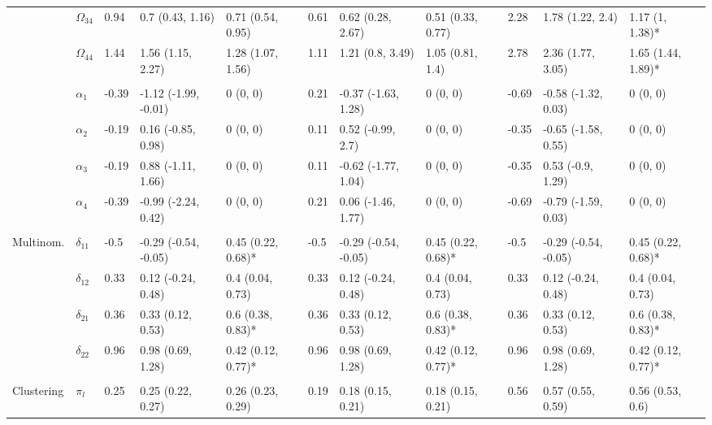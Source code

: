 \documentclass{article}
\begin{document}
\begin{landscape}
\begin{table}[t]
\begin{tabular}{lllllllllll}
\hspace{1em} & $\Omega_{34}$ & 0.94 & 0.7 (0.43, 1.16) & 0.71 (0.54, 0.95) & 0.61 & 0.62 (0.28, 2.67) & 0.51 (0.33, 0.77) & 2.28 & 1.78 (1.22, 2.4) & 1.17 (1, 1.38)*\\
\hspace{1em} & $\Omega_{44}$ & 1.44 & 1.56 (1.15, 2.27) & 1.28 (1.07, 1.56) & 1.11 & 1.21 (0.8, 3.49) & 1.05 (0.81, 1.4) & 2.78 & 2.36 (1.77, 3.05) & 1.65 (1.44, 1.89)*\\
\addlinespace[0.3em]
\multicolumn{11}{l}{\textbf{ }}\\
\hspace{1em} & $\alpha_{1}$ & -0.39 & -1.12 (-1.99, -0.01) & 0 (0, 0) & 0.21 & -0.37 (-1.63, 1.28) & 0 (0, 0) & -0.69 & -0.58 (-1.32, 0.03) & 0 (0, 0)\\
\hspace{1em} & $\alpha_{2}$ & -0.19 & 0.16 (-0.85, 0.98) & 0 (0, 0) & 0.11 & 0.52 (-0.99, 2.7) & 0 (0, 0) & -0.35 & -0.65 (-1.58, 0.55) & 0 (0, 0)\\
\hspace{1em} & $\alpha_{3}$ & -0.19 & 0.88 (-1.11, 1.66) & 0 (0, 0) & 0.11 & -0.62 (-1.77, 1.04) & 0 (0, 0) & -0.35 & 0.53 (-0.9, 1.29) & 0 (0, 0)\\
\hspace{1em} & $\alpha_{4}$ & -0.39 & -0.99 (-2.24, 0.42) & 0 (0, 0) & 0.21 & 0.06 (-1.46, 1.77) & 0 (0, 0) & -0.69 & -0.79 (-1.59, 0.03) & 0 (0, 0)\\
\addlinespace[0.3em]
\multicolumn{11}{l}{\textbf{ }}\\
\hspace{1em}Multinom. & $\delta_{11}$ & -0.5 & -0.29 (-0.54, -0.05) & 0.45 (0.22, 0.68)* & -0.5 & -0.29 (-0.54, -0.05) & 0.45 (0.22, 0.68)* & -0.5 & -0.29 (-0.54, -0.05) & 0.45 (0.22, 0.68)*\\
\hspace{1em} & $\delta_{12}$ & 0.33 & 0.12 (-0.24, 0.48) & 0.4 (0.04, 0.73) & 0.33 & 0.12 (-0.24, 0.48) & 0.4 (0.04, 0.73) & 0.33 & 0.12 (-0.24, 0.48) & 0.4 (0.04, 0.73)\\
\hspace{1em} & $\delta_{21}$ & 0.36 & 0.33 (0.12, 0.53) & 0.6 (0.38, 0.83)* & 0.36 & 0.33 (0.12, 0.53) & 0.6 (0.38, 0.83)* & 0.36 & 0.33 (0.12, 0.53) & 0.6 (0.38, 0.83)*\\
\hspace{1em} & $\delta_{22}$ & 0.96 & 0.98 (0.69, 1.28) & 0.42 (0.12, 0.77)* & 0.96 & 0.98 (0.69, 1.28) & 0.42 (0.12, 0.77)* & 0.96 & 0.98 (0.69, 1.28) & 0.42 (0.12, 0.77)*\\
\addlinespace[0.3em]
\multicolumn{11}{l}{\textbf{ }}\\
\hspace{1em}Clustering & $\pi_l$ & 0.25 & 0.25 (0.22, 0.27) & 0.26 (0.23, 0.29) & 0.19 & 0.18 (0.15, 0.21) & 0.18 (0.15, 0.21) & 0.56 & 0.57 (0.55, 0.59) & 0.56 (0.53, 0.6)\\
\bottomrule
\end{tabular}
\end{table}
\end{landscape}
\end{document}
